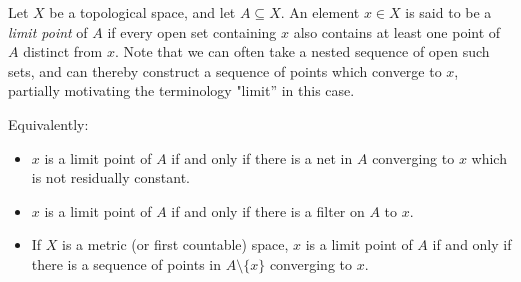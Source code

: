 \documentclass[12pt]{article}
\begin{document}
Let $X$ be a topological space, and let $A\subseteq X$.  An element $x\in X$ is said to be a \emph{limit point} of $A$ if every open set containing $x$ also contains at least one point of $A$ distinct from $x$.  Note that we can often take a nested sequence of open such sets, and can thereby construct a sequence of points which converge to $x$, partially motivating the terminology "limit'' in this case.

Equivalently:
\begin{itemize}
\item $x$ is a limit point of $A$ if and only if there is a net in $A$ converging to $x$ which is not residually constant.
\item $x$ is a limit point of $A$ if and only if there is a filter on $A$  to $x$.
\item If $X$ is a metric (or first countable) space, $x$ is a limit point of $A$ if and only if there is a sequence of points in $A\setminus\{x\}$ converging to $x$.
\end{itemize}
\end{document}

